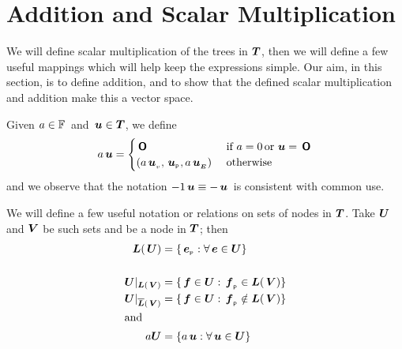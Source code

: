 
    


\section{Addition and Scalar Multiplication}
We will define scalar multiplication of the trees in $\boldsymbol{T}$, then  we will define a few useful mappings which will help keep the expressions simple. Our aim, in this section, is
to define addition, and to show that the defined scalar multiplication and addition make this a vector space.

\begin{definition}
  Given \(a \in \mathbb{F}\)\ and \(\,\boldsymbol{u} \in \boldsymbol{T}\), we
  define
  \begin{align*}
      a \,\boldsymbol{u} = \begin{cases}
        \,\boldsymbol{\mathsf{O}}  & \text{ if } a = 0 \operatorname{\text{or}} \,\boldsymbol{u} = \,\boldsymbol{\mathsf{O}} \\
        (a {\,\boldsymbol{u}}_{{}_{v}}, {\,\boldsymbol{u}}_{{}_{\mathsf{P}}}, a{\,\boldsymbol{u}}_{{}_{\boldsymbol{E}}}) & \text{ otherwise }
      \end{cases}
  \end{align*}
  and we observe that the notation \(-1 \,\boldsymbol{u} \equiv  -\,\boldsymbol{u}\)\ is
  consistent with common use.
\end{definition}

\begin{definition}\label{useful-set-functions}
  We will define a few useful notation or relations on sets of nodes
  in $\boldsymbol{T}$. Take \(\boldsymbol{U}\) and \(\boldsymbol{V}\) be such sets and
   be a node in $\boldsymbol{T}$; then 
  \begin{align*}
      \boldsymbol{L}(\,\boldsymbol{U}) &= \{{\,\boldsymbol{e}}_{{}_{\mathsf{P}}}: \forall \,\boldsymbol{e} \in \boldsymbol{U}\} \notag\\
      & \notag\\
      \boldsymbol{U}\vert_{\boldsymbol{L}(\,\boldsymbol{V})} &= \{\,\boldsymbol{f} \in \boldsymbol{U}: {\,\boldsymbol{f}}_{{}_{\mathsf{P}}} \in \boldsymbol{L}(\,\boldsymbol{V}) \} \notag\\
      \boldsymbol{U}\vert_{\overline{\boldsymbol{L}}(\,\boldsymbol{V})} &= \{ \,\boldsymbol{f} \in \boldsymbol{U}: {\,\boldsymbol{f}}_{{}_{\mathsf{P}}} \notin \boldsymbol{L}(\,\boldsymbol{V}) \} \label{restrictions}\notag\\
      \intertext{and}
      a \boldsymbol{U} &= \{a \,\boldsymbol{u}: \forall \,\boldsymbol{u} \in \boldsymbol{U}\} \notag
  \end{align*}
\end{definition}


